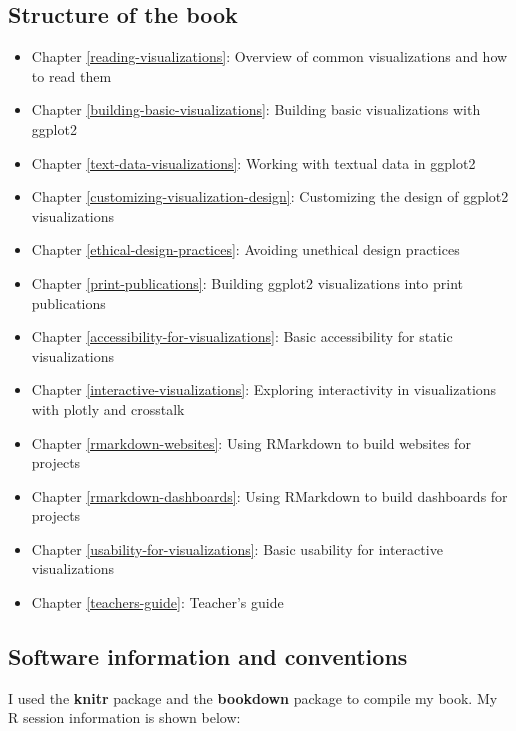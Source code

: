 \documentclass[
]{krantz}
\providecommand{\tightlist}{%
  \setlength{\itemsep}{0pt}\setlength{\parskip}{0pt}}
\begin{document}
\hypertarget{structure-of-the-book}{%
\subsection*{Structure of the book}\label{structure-of-the-book}}


\begin{itemize}
\tightlist
\item
  Chapter \ref{reading-visualizations}: Overview of common visualizations and how to read them
\item
  Chapter \ref{building-basic-visualizations}: Building basic visualizations with ggplot2
\item
  Chapter \ref{text-data-visualizations}: Working with textual data in ggplot2
\item
  Chapter \ref{customizing-visualization-design}: Customizing the design of ggplot2 visualizations
\item
  Chapter \ref{ethical-design-practices}: Avoiding unethical design practices
\item
  Chapter \ref{print-publications}: Building ggplot2 visualizations into print publications
\item
  Chapter \ref{accessibility-for-visualizations}: Basic accessibility for static visualizations
\item
  Chapter \ref{interactive-visualizations}: Exploring interactivity in visualizations with plotly and crosstalk
\item
  Chapter \ref{rmarkdown-websites}: Using RMarkdown to build websites for projects
\item
  Chapter \ref{rmarkdown-dashboards}: Using RMarkdown to build dashboards for projects
\item
  Chapter \ref{usability-for-visualizations}: Basic usability for interactive visualizations
\item
  Chapter \ref{teachers-guide}: Teacher's guide
\end{itemize}

\hypertarget{software-information-and-conventions}{%
\subsection*{Software information and conventions}\label{software-information-and-conventions}}


I used the \textbf{knitr} package \citep{xie2015} and the \textbf{bookdown} package \citep{R-bookdown} to compile my book. My R session information is shown below:
\end{document}
